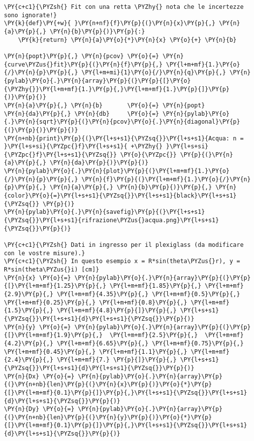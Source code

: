 \begin{Verbatim}[label=\makebox{\href{https://github.com/unipi-physics-labs/lab1-sheets/tree/main/snippy/refraction_index.py}{https://github.com/.../refraction\_index.py}},commandchars=\\\{\}]
\PY{c+c1}{\PYZsh{} Fit con una retta \PYZhy{} nota che le incertezze sono ignorate!}
\PY{k}{def}\PY{+w}{ }\PY{n+nf}{f}\PY{p}{(}\PY{n}{x}\PY{p}{,} \PY{n}{a}\PY{p}{,} \PY{n}{b}\PY{p}{)}\PY{p}{:}
    \PY{k}{return} \PY{n}{a}\PY{o}{*}\PY{n}{x} \PY{o}{+} \PY{n}{b}

\PY{n}{popt}\PY{p}{,} \PY{n}{pcov} \PY{o}{=} \PY{n}{curve\PYZus{}fit}\PY{p}{(}\PY{n}{f}\PY{p}{,} \PY{l+m+mf}{1.}\PY{o}{/}\PY{n}{p}\PY{p}{,} \PY{l+m+mi}{1}\PY{o}{/}\PY{n}{q}\PY{p}{,} \PY{n}{pylab}\PY{o}{.}\PY{n}{array}\PY{p}{(}\PY{p}{[}\PY{o}{\PYZhy{}}\PY{l+m+mf}{1.}\PY{p}{,}\PY{l+m+mf}{1.}\PY{p}{]}\PY{p}{)}\PY{p}{)}
\PY{n}{a}\PY{p}{,} \PY{n}{b}       \PY{o}{=} \PY{n}{popt}
\PY{n}{da}\PY{p}{,} \PY{n}{db}     \PY{o}{=} \PY{n}{pylab}\PY{o}{.}\PY{n}{sqrt}\PY{p}{(}\PY{n}{pcov}\PY{o}{.}\PY{n}{diagonal}\PY{p}{(}\PY{p}{)}\PY{p}{)}
\PY{n+nb}{print}\PY{p}{(}\PY{l+s+s1}{\PYZsq{}}\PY{l+s+s1}{Acqua: n = }\PY{l+s+si}{\PYZpc{}f}\PY{l+s+s1}{ +\PYZhy{} }\PY{l+s+si}{\PYZpc{}f}\PY{l+s+s1}{\PYZsq{}} \PY{o}{\PYZpc{}} \PY{p}{(}\PY{n}{a}\PY{p}{,} \PY{n}{da}\PY{p}{)}\PY{p}{)}
\PY{n}{pylab}\PY{o}{.}\PY{n}{plot}\PY{p}{(}\PY{l+m+mf}{1.}\PY{o}{/}\PY{n}{p}\PY{p}{,} \PY{n}{f}\PY{p}{(}\PY{l+m+mf}{1.}\PY{o}{/}\PY{n}{p}\PY{p}{,} \PY{n}{a}\PY{p}{,} \PY{n}{b}\PY{p}{)}\PY{p}{,} \PY{n}{color}\PY{o}{=}\PY{l+s+s1}{\PYZsq{}}\PY{l+s+s1}{black}\PY{l+s+s1}{\PYZsq{}} \PY{p}{)}
\PY{n}{pylab}\PY{o}{.}\PY{n}{savefig}\PY{p}{(}\PY{l+s+s1}{\PYZsq{}}\PY{l+s+s1}{rifrazione\PYZus{}acqua.png}\PY{l+s+s1}{\PYZsq{}}\PY{p}{)}

\PY{c+c1}{\PYZsh{} Dati in ingresso per il plexiglass (da modificare con le vostre misure).}
\PY{c+c1}{\PYZsh{} In questo esempio x = R*sin(theta\PYZus{}r), y = R*sin(theta\PYZus{}i) [cm]}
\PY{n}{x} \PY{o}{=} \PY{n}{pylab}\PY{o}{.}\PY{n}{array}\PY{p}{(}\PY{p}{[}\PY{l+m+mf}{1.25}\PY{p}{,} \PY{l+m+mf}{1.85}\PY{p}{,} \PY{l+m+mf}{2.9}\PY{p}{,} \PY{l+m+mf}{4.35}\PY{p}{,} \PY{l+m+mf}{0.5}\PY{p}{,}  \PY{l+m+mf}{0.25}\PY{p}{,} \PY{l+m+mf}{0.8}\PY{p}{,} \PY{l+m+mf}{1.5}\PY{p}{,} \PY{l+m+mf}{4.8}\PY{p}{]}\PY{p}{,} \PY{l+s+s1}{\PYZsq{}}\PY{l+s+s1}{d}\PY{l+s+s1}{\PYZsq{}}\PY{p}{)}
\PY{n}{y} \PY{o}{=} \PY{n}{pylab}\PY{o}{.}\PY{n}{array}\PY{p}{(}\PY{p}{[}\PY{l+m+mf}{1.9}\PY{p}{,}  \PY{l+m+mf}{2.5}\PY{p}{,}  \PY{l+m+mf}{4.2}\PY{p}{,} \PY{l+m+mf}{6.65}\PY{p}{,} \PY{l+m+mf}{0.75}\PY{p}{,} \PY{l+m+mf}{0.45}\PY{p}{,} \PY{l+m+mf}{1.1}\PY{p}{,} \PY{l+m+mf}{2.4}\PY{p}{,} \PY{l+m+mf}{7.} \PY{p}{]}\PY{p}{,} \PY{l+s+s1}{\PYZsq{}}\PY{l+s+s1}{d}\PY{l+s+s1}{\PYZsq{}}\PY{p}{)}
\PY{n}{Dx} \PY{o}{=} \PY{n}{pylab}\PY{o}{.}\PY{n}{array}\PY{p}{(}\PY{n+nb}{len}\PY{p}{(}\PY{n}{x}\PY{p}{)}\PY{o}{*}\PY{p}{[}\PY{l+m+mf}{0.1}\PY{p}{]}\PY{p}{,}\PY{l+s+s1}{\PYZsq{}}\PY{l+s+s1}{d}\PY{l+s+s1}{\PYZsq{}}\PY{p}{)}
\PY{n}{Dy} \PY{o}{=} \PY{n}{pylab}\PY{o}{.}\PY{n}{array}\PY{p}{(}\PY{n+nb}{len}\PY{p}{(}\PY{n}{y}\PY{p}{)}\PY{o}{*}\PY{p}{[}\PY{l+m+mf}{0.1}\PY{p}{]}\PY{p}{,}\PY{l+s+s1}{\PYZsq{}}\PY{l+s+s1}{d}\PY{l+s+s1}{\PYZsq{}}\PY{p}{)}


\end{Verbatim}
